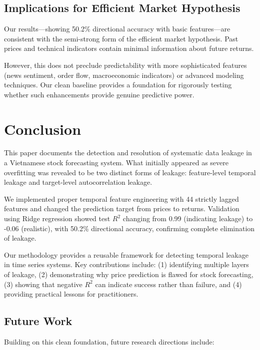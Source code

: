 \documentclass[conference]{IEEEtran}
\begin{document}
\subsection{Implications for Efficient Market Hypothesis}

Our results—showing 50.2\% directional accuracy with basic features—are consistent with the semi-strong form of the efficient market hypothesis. Past prices and technical indicators contain minimal information about future returns.

However, this does not preclude predictability with more sophisticated features (news sentiment, order flow, macroeconomic indicators) or advanced modeling techniques. Our clean baseline provides a foundation for rigorously testing whether such enhancements provide genuine predictive power.

\section{Conclusion}

This paper documents the detection and resolution of systematic data leakage in a Vietnamese stock forecasting system. What initially appeared as severe overfitting was revealed to be two distinct forms of leakage: feature-level temporal leakage and target-level autocorrelation leakage.

We implemented proper temporal feature engineering with 44 strictly lagged features and changed the prediction target from prices to returns. Validation using Ridge regression showed test $R^2$ changing from 0.99 (indicating leakage) to -0.06 (realistic), with 50.2\% directional accuracy, confirming complete elimination of leakage.

Our methodology provides a reusable framework for detecting temporal leakage in time series systems. Key contributions include: (1) identifying multiple layers of leakage, (2) demonstrating why price prediction is flawed for stock forecasting, (3) showing that negative $R^2$ can indicate success rather than failure, and (4) providing practical lessons for practitioners.

\subsection{Future Work}

Building on this clean foundation, future research directions include:
\end{document}

